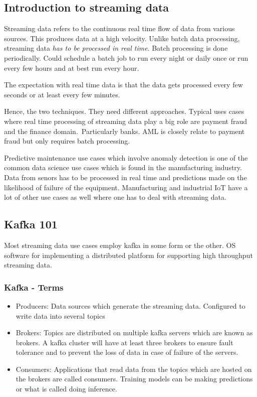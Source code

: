 
\subsection{Introduction to streaming data}

Streaming data refers to the continuous real time flow of data from various sources.
This produces data at a high velocity.
Unlike batch data processing, streaming data \textit{has to be processed in real time}.
Batch processing is done periodically.
Could schedule a batch job to run every night or daily once or run every few hours and at best run every hour.

\begin{note}
    The expectation with real time data is that the data gets processed every few seconds or at least every few minutes.
\end{note}

Hence, the two techniques.
They need different approaches.
Typical uses cases where real time processing of streaming data play a big role are payment fraud and the finance domain.\ Particularly banks.
AML is closely relate to payment fraud but only requires batch processing.

Predictive maintenance use cases which involve anomaly detection is one of the common data science use cases which is found in the manufacturing industry.
Data from senors has to be processed in real time and predictions made on the likelihood of failure of the equipment.
Manufacturing and industrial IoT have a lot of other use cases as well where one has to deal with streaming data.

\subsection{Kafka 101}

Most streaming data use cases employ kafka in some form or the other.
OS software for implementing a distributed platform for supporting high throughput streaming data.

\subsubsection{Kafka - Terms}
\begin{itemize}
    \item Producers: Data sources which generate the streaming data. Configured to write data into several topics
    \item Brokers: Topics are distributed on multiple kafka servers which are known as brokers. A kafka cluster will have at least three brokers to ensure fault tolerance and to prevent the loss of data in case of failure of the servers.
    \item Consumers: Applications that read data from the topics which are hosted on the brokers are called consumers. Training models can be making predictions or what is called doing inference.
\end{itemize}

